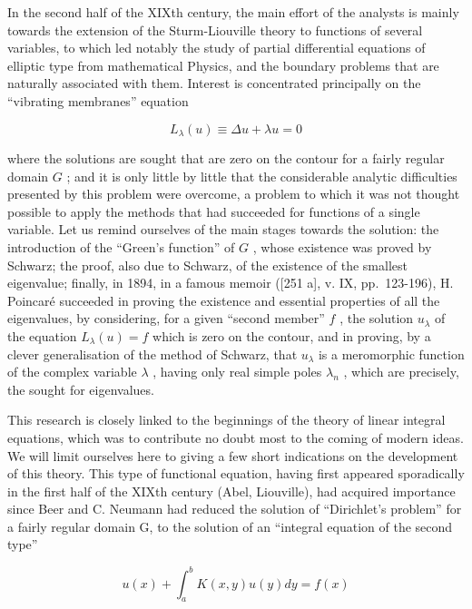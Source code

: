 In the second half of the XIXth century, the main effort of the analysts is mainly towards the extension of the Sturm-Liouville theory to functions of several variables, to which led notably the study of partial differential equations of elliptic type from mathematical Physics, and the boundary problems that are naturally associated with them. Interest is concentrated principally on the ``vibrating membranes'' equation

\[
L _ {\lambda} (u) \equiv \Delta u + \lambda u = 0\tag{21.3}
\]

where the solutions are sought that are zero on the contour for a fairly regular domain \(G\) ; and it is only little by little that the considerable analytic difficulties presented by this problem were overcome, a problem to which it was not thought possible to apply the methods that had succeeded for functions of a single variable. Let us remind ourselves of the main stages towards the solution: the introduction of the ``Green's function'' of \(G\) , whose existence was proved by Schwarz; the proof, also due to Schwarz, of the existence of the smallest eigenvalue; finally, in 1894, in a famous memoir ({[}251 a{]}, v. IX, pp.~123-196), H. Poincaré succeeded in proving the existence and essential properties of all the eigenvalues, by considering, for a given ``second member'' \(f\) , the solution \(u_{\lambda}\) of the equation \(L_{\lambda}(u) = f\) which is zero on the contour, and in proving, by a clever generalisation of the method of Schwarz, that \(u_{\lambda}\) is a meromorphic function of the complex variable \(\lambda\) , having only real simple poles \(\lambda_n\) , which are precisely, the sought for eigenvalues.

This research is closely linked to the beginnings of the theory of linear integral equations, which was to contribute no doubt most to the coming of modern ideas. We will limit ourselves here to giving a few short indications on the development of this theory. This type of functional equation, having first appeared sporadically in the first half of the XIXth century (Abel, Liouville), had acquired importance since Beer and C. Neumann had reduced the solution of ``Dirichlet's problem'' for a fairly regular domain G, to the solution of an ``integral equation of the second type''

\[
u (x) + \int_ {a} ^ {b} K (x, y) u (y) d y = f (x)\tag{21.4}
\]

